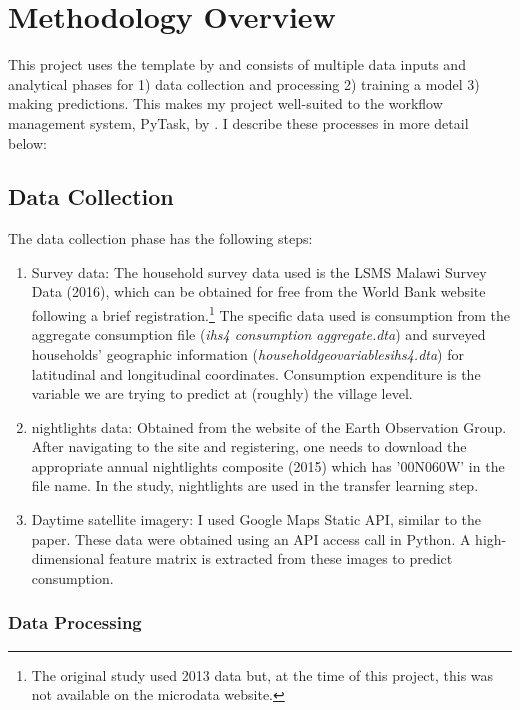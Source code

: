 \documentclass[11pt, a4paper, leqno]{article}
\begin{document}
\section{Methodology Overview} 
 This project uses the template by \citet{GaudeckerEconProjectTemplates} and consists of multiple data inputs and analytical phases for 1) data collection and processing 2) training a model 3) making predictions. This makes my project well-suited to the workflow management system, PyTask, by \citet{Raabe2020}. I describe these processes in more detail below:

\subsection{Data Collection}

 The data collection phase has the following steps: \vspace{-0.2cm}
\begin{enumerate}
	\item Survey data: The household survey data used is the LSMS Malawi Survey Data (2016), which can be obtained for free from the World Bank website following a brief registration.\footnote{The original study used 2013 data but, at the time of this project, this was not available on the microdata website.} The specific data used is consumption from the aggregate consumption file (\textit{ihs4 consumption aggregate.dta}) and surveyed households' geographic information (\textit{householdgeovariablesihs4.dta}) for latitudinal and longitudinal coordinates. Consumption expenditure is the variable we are trying to predict at (roughly) the village level.
	\item nightlights data: Obtained from the website of the Earth Observation Group. After navigating to the site and registering, one needs to download the appropriate annual nightlights composite (2015) which has '00N060W' in the file name. In the study, nightlights are used in the transfer learning step.
	\item Daytime satellite imagery: I used Google Maps Static API, similar to the paper. These data were obtained using an API access call in Python. A high-dimensional feature matrix is extracted from these images to predict consumption.
\end{enumerate}

\subsubsection{Data Processing}
\end{document}
